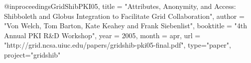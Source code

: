 @inproceedings{GridShibPKI05,
title   = "{A}ttributes, {A}nonymity, and {A}ccess: {S}hibboleth and {G}lobus {I}ntegration to {F}acilitate {G}rid {C}ollaboration",
author = "Von Welch, Tom Barton, Kate Keahey and Frank Siebenlist",
booktitle = "4th Annual PKI R\&D Workshop",
year = {2005},
month = apr,
url = "http://grid.ncsa.uiuc.edu/papers/gridshib-pki05-final.pdf",
type="paper",
project="gridshib"
}

